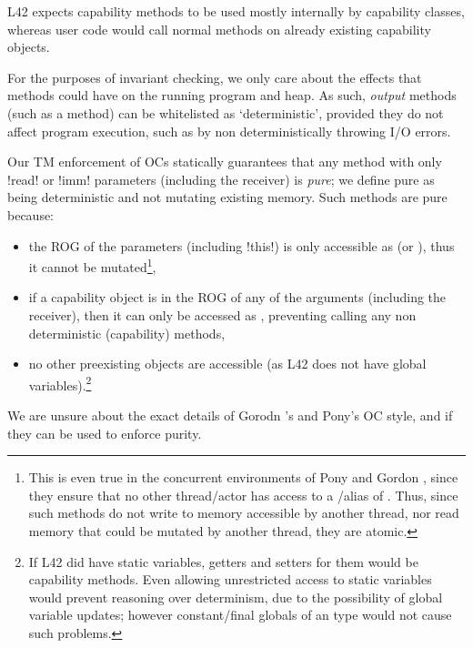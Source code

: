 \noindent L42 expects capability methods to be used mostly internally by capability classes, whereas user code would call normal methods on already existing capability objects.

For the purposes of invariant checking, we only care about the effects that methods could have on the running program and heap. As such, \emph{output} methods (such as a \Q@print@ method) can be whitelisted as `deterministic', provided they do not affect program execution, such as by non deterministically throwing I/O errors.

\label{s:purity}
Our TM enforcement of OCs statically guarantees that any method with only \Q!read! or \Q!imm! parameters (including the receiver) is \emph{pure}; we define pure
as being deterministic and not mutating existing memory. Such methods are pure because:
\SSI\begin{itemize}
	\item the ROG of the parameters (including \Q!this!) is only accessible as \Q@read@ (or \Q@imm@), thus it cannot be mutated\footnote{This is even true in the concurrent environments of Pony and Gordon \etal, since they ensure that no other thread/actor has access to a \Q@mut@/\Q@capsule@ alias of \Q@this@. 
	Thus, since such methods do not write to memory accessible by another thread, nor read memory that could be mutated by another thread, they are atomic.},
	\item if a capability object is in the ROG of any of the arguments (including the receiver), then it can only be accessed as \Q@read@, preventing calling any non deterministic (capability) methods,
	\item no other preexisting objects are accessible (as L42 does not have global variables).\footnote{%
		If L42 did have static variables, getters and setters for them would be capability methods.
		Even allowing unrestricted access to \Q@imm@
		static variables would prevent reasoning over
		determinism, due to the possibility of global variable
		updates; however constant/final globals of an 
		\Q@imm@ type would not cause such problems.%
	}
\end{itemize}
We are unsure about the exact details of Gorodn \etal's and Pony's OC style, and if they can be used to enforce purity.



